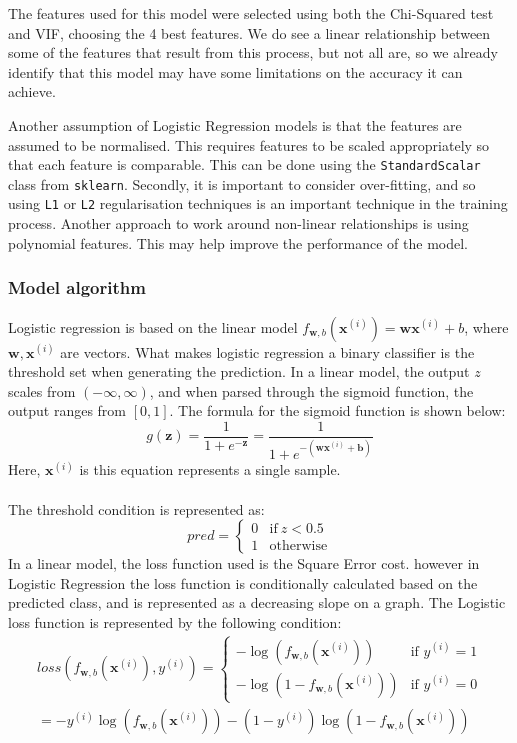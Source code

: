 \documentclass[10pt]{article}
\begin{document}
The features used for this model were selected using both the Chi-Squared test and VIF, choosing the 4 best features. We do see a linear relationship between some of the features that result from this process, but not all are, so we already identify that this model may have some limitations on the accuracy it can achieve. 

Another assumption of Logistic Regression models is that the features are assumed to be normalised. This requires features to be scaled appropriately so that each feature is comparable. This can be done using the \texttt{StandardScalar} class from \texttt{sklearn}. Secondly, it is important to consider over-fitting, and so using \texttt{L1} or \texttt{L2} regularisation techniques is an important technique in the training process. Another approach to work around non-linear relationships is using polynomial features. This may help improve the performance of the model.

\subsubsection{Model algorithm}
Logistic regression is based on the linear model \(f_{\mathbf{w},b}(\mathbf{x}^{(i)}) = \mathbf{w}\mathbf{x}^{(i)} + b\), where \(\textbf{w}, \textbf{x}^{(i)}\) are vectors. What makes logistic regression a binary classifier is the threshold set when generating the prediction. In a linear model, the output \(z\) scales from \(\left(-\infty, \infty \right) \), and when parsed through the sigmoid function, the output ranges from \([0, 1]\).  The formula for the sigmoid function is shown below:
\[
    g(\textbf{z}) = \frac{1}{1 + e^{-\textbf{z}}} = \frac{1}{1 + e^{-(\textbf{w}\textbf{x}^{(i)} + \textbf{b})}}
\]
 Here, \(\textbf{x}^{(i)}\) is this equation represents a single sample.
\\\\
The threshold condition is represented as:
\[
    pred =
    \begin{cases}
        0 & \text{if}\ z < 0.5 \\
        1 & \text{otherwise}
    \end{cases}
\]
In a linear model, the loss function used is the Square Error cost. however in Logistic Regression the loss function is conditionally calculated based on the predicted class, and is represented as a decreasing slope on a graph. The Logistic loss function is represented by the following condition:
\begin{align*}
loss(f_{\mathbf{w},b}(\mathbf{x}^{(i)}), y^{(i)}) = 
\begin{cases}
    - \log\left(f_{\mathbf{w},b}\left( \mathbf{x}^{(i)} \right) \right) & \text{if $y^{(i)}=1$}\\
    - \log \left( 1 - f_{\mathbf{w},b}\left( \mathbf{x}^{(i)} \right) \right) & \text{if $y^{(i)}=0$}
\end{cases}
\\ 
 = -y^{(i)} \log\left(f_{\mathbf{w},b}\left( \mathbf{x}^{(i)} \right) \right) - \left( 1 - y^{(i)}\right) \log \left( 1 - f_{\mathbf{w},b}\left( \mathbf{x}^{(i)} \right) \right)
\end{align*}
\end{document}
